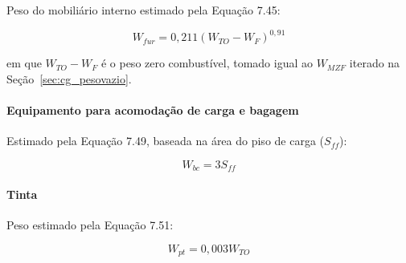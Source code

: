 Peso do mobiliário interno estimado pela Equação 7.45:

\begin{equation}
    W_{fur} = 0,211 (W_{TO} - W_F)^{0,91}
\end{equation}

em que $W_{TO} - W_F$ é o peso zero combustível, tomado igual ao $W_{MZF}$ iterado na Seção~\ref{sec:cg_pesovazio}.

\paragraph{Equipamento para acomodação de carga e bagagem}

Estimado pela Equação 7.49, baseada na área do piso de carga ($S_{ff}$):

\begin{equation}
    W_{bc} = 3 S_{ff}
\end{equation}

\paragraph{Tinta}

Peso estimado pela Equação 7.51:

\begin{equation}
    W_{pt} = 0,003 W_{TO}
\end{equation}

